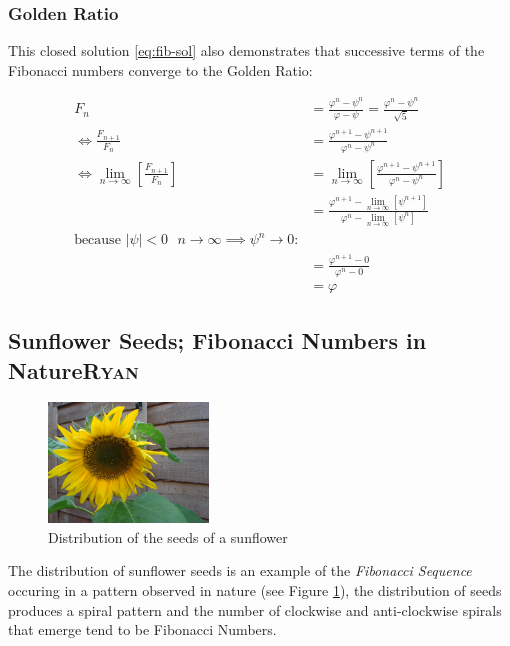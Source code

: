 \documentclass[a4paper,11pt,twoside]{article}
\begin{document}
\subsubsection{Golden Ratio}
\label{sec:orgc914084}
This closed solution \eqref{eq:fib-sol} also demonstrates that successive terms of the Fibonacci numbers converge to the Golden Ratio:



\begin{align*}
    F_n &= \frac{\varphi^n-\psi^n}{\varphi-\psi} = \frac{\varphi^n-\psi^n}{\sqrt 5} \\
    \iff \frac{F_{n+1}}{F_n}	&= \frac{\varphi^{n+ 1} - \psi^{n+  1}}{\varphi^{n} - \psi^{n}} \\
    \iff \lim_{n \rightarrow \infty}\left[ \frac{F_{n+1}}{F_n} \right]	&= \lim_{n \rightarrow \infty}\left[ \frac{\varphi^{n+ 1} - \psi^{n+  1}}{\varphi^{n} - \psi^{n}} \right] \\
&= \frac{\varphi^{n+ 1} -\lim_{n \rightarrow \infty}\left[ \psi^{n +  1} \right] }{\varphi^{n} - \lim_{n \rightarrow \infty}\left[ \psi^n \right] } \\
\text{because $\mid \psi \mid < 0$ $n \rightarrow \infty \implies \psi^{n} \rightarrow 0$:} \\
&= \frac{\varphi^{n+  1} -  0}{\varphi^{n} -  0} \\
&= \varphi
\end{align*}

\subsection{Sunflower Seeds; Fibonacci Numbers in Nature\hfill{}\textsc{Ryan}}
\label{sunflower-example}
\begin{figure}
\centering
\includegraphics[width=0.38\textwidth]{media/sunflower.jpg}
\caption{\label{sunflower}Distribution of the seeds of a sunflower \cite{simonbrassCCSearch2006}}
\end{figure}

The distribution of sunflower seeds is an example of the \emph{Fibonacci Sequence}
occuring in a pattern observed in nature (see Figure \ref{sunflower}), the distribution of seeds produces a spiral pattern and the number of clockwise and anti-clockwise spirals that emerge tend to be Fibonacci Numbers. \cite{bohannonSunflowersShowComplex2016}
\end{document}
